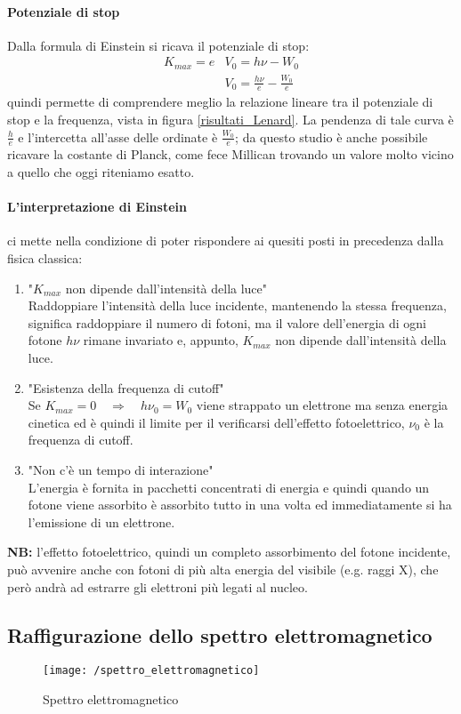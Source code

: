 \paragraph{Potenziale di stop}
Dalla formula di Einstein si ricava il potenziale di stop:
\begin{equation}
\begin{split}
K_{max} = e & V_0 = h\nu - W_0 \\
& V_0 = \frac{ h\nu}{e } - \frac{ W_0}{e }
\end{split}
\end{equation}
quindi permette di comprendere meglio la relazione lineare tra il potenziale  di stop e la frequenza, vista in figura \ref{risultati_Lenard}.
La pendenza di tale curva è $\frac{ h}{e }$ e l'intercetta all'asse delle ordinate è $\frac{ W_0}{e }$; da questo studio è anche possibile ricavare la costante di Planck, come fece Millican trovando un valore molto vicino a quello che oggi riteniamo esatto.

\newpage

\paragraph{L'interpretazione di Einstein} ci mette nella condizione di poter rispondere ai quesiti posti in precedenza dalla fisica classica:
\begin{enumerate}[label=\Roman{*}]
\item "$K_{max}$ non dipende dall'intensità della luce" \\
Raddoppiare l'intensità della luce incidente, mantenendo la stessa frequenza, significa raddoppiare il numero di fotoni, ma il valore dell'energia di ogni fotone $h\nu$ rimane invariato e, appunto, $K_{max}$ non dipende dall'intensità della luce.
\item "Esistenza della frequenza di cutoff"\\
Se $K_{max} = 0 \quad \Rightarrow \quad h\nu_0 = W_0$ viene strappato un elettrone ma senza energia cinetica ed è quindi il limite per il verificarsi dell'effetto fotoelettrico, $\nu_0$ è la frequenza di cutoff.
\item "Non c'è un tempo di interazione"\\
L'energia è fornita in pacchetti concentrati di energia e quindi quando un fotone viene assorbito è assorbito tutto in una volta ed immediatamente si ha l'emissione di un elettrone.
\end{enumerate}
\textbf{NB:} l'effetto fotoelettrico, quindi un completo assorbimento del fotone incidente, può avvenire anche con fotoni di più alta energia del visibile (e.g. raggi X), che però andrà ad estrarre gli elettroni più legati al nucleo.


\subsection{Raffigurazione dello spettro elettromagnetico}
\begin{figure}[h]
\centering
\texttt{[image: /spettro\_elettromagnetico]}
\caption{Spettro elettromagnetico}
\end{figure}




